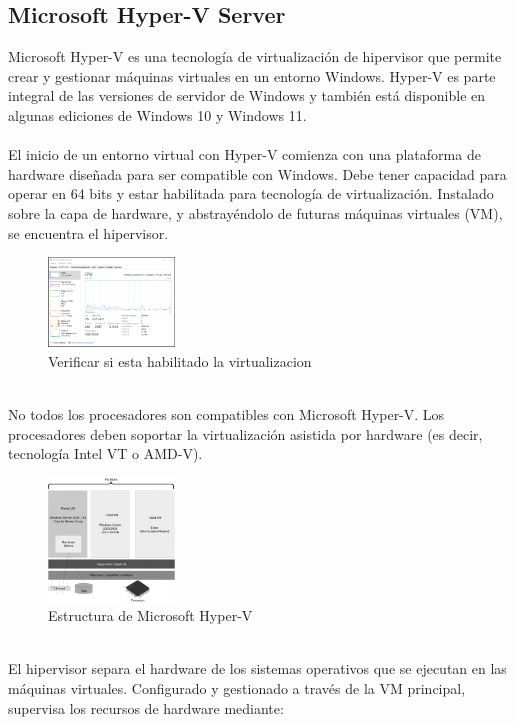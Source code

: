 \documentclass[journal]{IEEEtran}
\begin{document}
\subsection{Microsoft Hyper-V Server}
Microsoft Hyper-V es una tecnología de virtualización de hipervisor que permite crear y gestionar máquinas virtuales en un entorno Windows. Hyper-V es parte integral de las versiones de servidor de Windows y también está disponible en algunas ediciones de Windows 10 y Windows 11.
\\ \\
El inicio de un entorno virtual con Hyper-V comienza con una plataforma de hardware diseñada para ser compatible con Windows. Debe tener capacidad para operar en 64 bits y estar habilitada para tecnología de virtualización. Instalado sobre la capa de hardware, y abstrayéndolo de futuras máquinas virtuales (VM), se encuentra el hipervisor.\cite{OLZAK20101}
\begin{figure}[htbp]
  \centering
  \includegraphics[width=0.3\textwidth]{verificarVirtualizacion.PNG}
  \caption{Verificar si esta habilitado la virtualizacion}
\end{figure}
\\
No todos los procesadores son compatibles con Microsoft Hyper-V. Los procesadores deben soportar la virtualización asistida por hardware (es decir, tecnología Intel VT o AMD-V). 
\begin{figure}[htbp]
  \centering
  \includegraphics[width=0.3\textwidth]{Hyper V - estructura.jpg}
  \caption{Estructura de Microsoft Hyper-V}
\end{figure}
\\
El hipervisor separa el hardware de los sistemas operativos que se ejecutan en las máquinas virtuales. Configurado y gestionado a través de la VM principal, supervisa los recursos de hardware mediante: 
\end{document}
